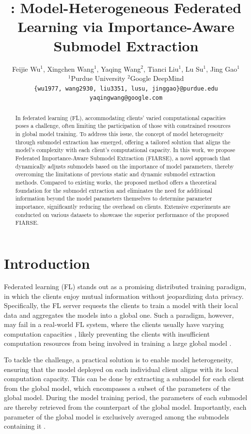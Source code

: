 \documentclass{article}
\title{\algo: Model-Heterogeneous Federated Learning via Importance-Aware Submodel Extraction}
\author{%
  Feijie Wu$^1$, Xingchen Wang$^1$, Yaqing Wang$^2$, Tianci Liu$^1$, Lu Su$^1$, Jing Gao$^1$ \\
  $^1$Purdue University \quad
  $^2$Google DeepMind \\
  \texttt{\{wu1977, wang2930, liu3351, lusu, jinggao\}@purdue.edu} \\
  \texttt{yaqingwang@google.com}
  \And
}
\renewcommand{\cite}{\citep}
\theoremstyle{plain}
\theoremstyle{definition}
\theoremstyle{remark}
\newcommand{\algo}{\ensuremath{\text{FIARSE}}\xspace}
\begin{document}
\maketitle


\begin{abstract}
{In federated learning (FL), accommodating clients' varied computational capacities poses a challenge, often limiting the participation of those with constrained resources in global model training.  To address this issue, the concept of model heterogeneity through submodel extraction has emerged, offering a tailored solution that aligns the model's complexity with each client's computational capacity. In this work, we propose Federated Importance-Aware Submodel Extraction (\algo), a novel approach that dynamically adjusts submodels based on the importance of model parameters, thereby overcoming the limitations of previous static and dynamic submodel extraction methods.  Compared to existing works, the proposed method offers a theoretical foundation for the submodel extraction and eliminates the need for additional information beyond the model parameters themselves to determine parameter importance, significantly reducing the overhead on clients. Extensive experiments are conducted on various datasets to showcase the superior performance of the proposed \algo.}
\end{abstract}


\section{Introduction} \label{sec:introduction}

Federated learning (FL) \cite{konevcny2016federated, mcmahan2017communication} stands out as a promising distributed training paradigm, in which the clients enjoy mutual information without jeopardizing data privacy. Specifically, the FL server requests the clients to train a model with their local data and aggregates the models into a global one. Such a paradigm, however, may fail in a real-world FL system, where the clients usually have varying computation capacities \cite{li2019online, diao2020heterofl, lin2020ensemble}, likely preventing the clients with insufficient computation resources from being involved in training a large global model \cite{wu2024fedbiot}. 

To tackle the challenge, a practical solution is to enable model heterogeneity, ensuring that the model deployed on each individual client aligns with its local computation capacity. This can be done by extracting a submodel for each client from the global model, which encompasses a subset of the parameters of the global model. During the model training period, the parameters of each submodel are thereby retrieved from the counterpart of the global model. Importantly, each parameter of the global model is exclusively averaged among the submodels containing it \cite{diao2020heterofl}. 
\end{document}
